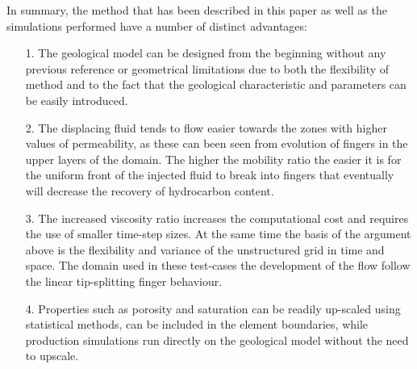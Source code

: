 \documentclass[preprint,authoryear,12pt]{elsarticle}
\newcommand{\KCnote}[1]{\fbox{\parbox{\textwidth}{ \color{black} KC Note $\Rightarrow$ #1}}}
\begin{document}
\medskip
In summary, the method that has been described in this paper as well as the simulations performed have a number of distinct advantages: 
\begin{enumerate}
\item[1.] The geological model can be designed from the beginning without any previous reference or geometrical limitations due to both the flexibility of method and to the fact that the geological characteristic and parameters can be easily introduced.

\item[2.] The displacing fluid tends to flow easier towards the zones with higher values of permeability, as these can been seen from evolution of fingers in the upper layers of the domain. The higher the mobility ratio the easier it is for the uniform front of the injected fluid to break into fingers that eventually will decrease the recovery of hydrocarbon content.
\item[3.] The increased viscosity ratio increases the computational cost and requires the use of smaller time-step sizes. At the same time the basis of the argument above is the flexibility and variance of the unstructured grid in time and space. The domain used in these test-cases the development of the flow follow the linear tip-splitting finger behaviour.
\item[4.] Properties such as porosity and saturation can be readily up-scaled using statistical methods, can be included in the element boundaries,  while production simulations run directly on the geological model without the need to upscale.
\end{enumerate}

\end{document}
